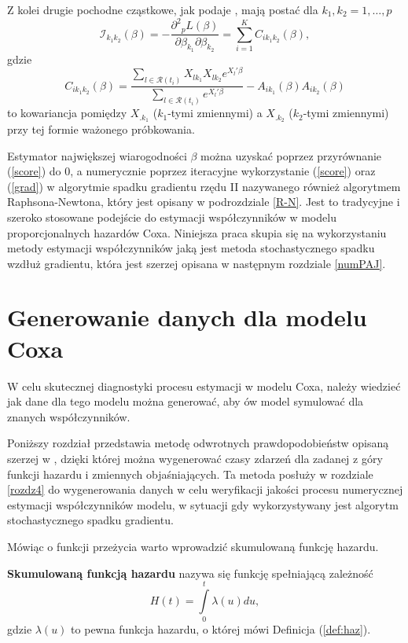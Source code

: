 Z kolei drugie pochodne cząstkowe, jak podaje \cite{cox}, mają postać dla $k_1,k_2=1,\dots,p$
\begin{equation}\label{grad}
\mathscr{I}_{k_1k_2}(\beta) = - \dfrac{\partial^2{}_{p}L(\beta)}{\partial\beta_{k_1}\partial\beta_{k_2}}=\sum\limits_{i=1}^{K}C_{ik_1k_2}(\beta),
\end{equation}
gdzie
\begin{equation}
C_{ik_1k_2}(\beta)=\dfrac{\sum\limits_{l\in \mathscr{R}(t_i)}^{} X_{lk_1}X_{lk_2}e^{X_l'\beta}}{\sum\limits_{l\in \mathscr{R}(t_i)}^{} e^{X_l'\beta}} - A_{ik_1}(\beta)A_{ik_2}(\beta)
\end{equation}
to kowariancja pomiędzy $X_{.k_1}$ ($k_1$-tymi zmiennymi) a $X_{.k_2}$ ($k_2$-tymi zmiennymi) przy tej formie ważonego próbkowania.

Estymator największej wiarogodności $\beta$ można uzyskać poprzez przyrównanie (\ref{score}) do $0$, a numerycznie poprzez iteracyjne wykorzystanie (\ref{score}) oraz (\ref{grad}) w algorytmie spadku gradientu rzędu II nazywanego również algorytmem Raphsona-Newtona, który jest opisany w podrozdziale \ref{R-N}. Jest to tradycyjne i szeroko stosowane podejście do estymacji współczynników w modelu proporcjonalnych hazardów Coxa. Niniejsza praca skupia się na wykorzystaniu metody estymacji współczynników jaką jest metoda stochastycznego spadku wzdłuż gradientu, która jest szerzej opisana w następnym rozdziale \ref{numPAJ}.

\newpage

\section{Generowanie danych dla modelu Coxa}

W celu skutecznej diagnostyki procesu estymacji w modelu Coxa, należy wiedzieć jak dane dla tego modelu można generować, aby ów model symulować dla znanych współczynników.

Poniższy rozdział przedstawia metodę odwrotnych prawdopodobieństw opisaną szerzej w \cite{bender}, dzięki której można wygenerować czasy zdarzeń dla zadanej z góry funkcji hazardu i zmiennych objaśniających. Ta metoda posłuży w rozdziale \ref{rozdz4} do wygenerowania danych w celu weryfikacji jakości procesu numerycznej estymacji współczynników modelu, w sytuacji gdy wykorzystywany jest algorytm stochastycznego spadku gradientu.

Mówiąc o funkcji przeżycia warto wprowadzić skumulowaną funkcję hazardu.
\begin{definition}
\textbf{Skumulowaną funkcją hazardu} nazywa się funkcję spełniającą zależność
\begin{equation}\label{zaradzix}
H(t) = \int\limits_{0}^{t}\lambda(u) du,
\end{equation}
gdzie $\lambda(u)$ to pewna funkcja hazardu, o której mówi Definicja (\ref{def:haz}).
\end{definition}

